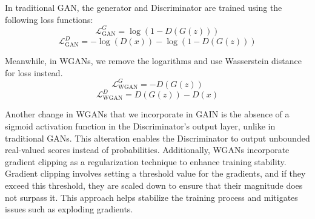 In traditional GAN, the generator and Discriminator are trained using the following loss functions:
\[
\mathcal{L}_{\text{GAN}}^G = \log(1 - D(G(z)))
\]
\[
\mathcal{L}_{\text{GAN}}^D = -\log(D(x)) - \log(1 - D(G(z)))
\]

Meanwhile, in WGANs, we remove the logarithms and use Wasserstein distance for loss instead.
\[
\mathcal{L}_{\text{WGAN}}^G = -D(G(z))
\]
\[
\mathcal{L}_{\text{WGAN}}^D = D(G(z)) - D(x)
\]

Another change in WGANs that we incorporate in GAIN is the absence of a sigmoid activation function in the Discriminator's output layer, unlike in traditional GANs. This alteration enables the Discriminator to output unbounded real-valued scores instead of probabilities. Additionally, WGANs incorporate gradient clipping as a regularization technique to enhance training stability. Gradient clipping involves setting a threshold value for the gradients, and if they exceed this threshold, they are scaled down to ensure that their magnitude does not surpass it. This approach helps stabilize the training process and mitigates issues such as exploding gradients.